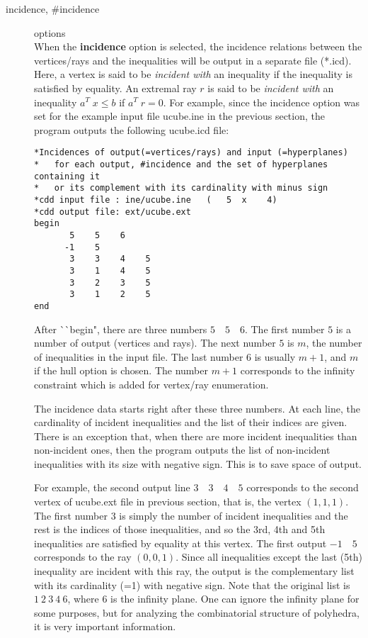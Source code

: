 \begin{description}
\item[incidence, \#incidence] options\\
When the {\bf incidence} option is selected, the incidence relations between
the vertices/rays and the inequalities will be output
in a separate file (*.icd).  Here, a vertex is said to be 
{\em incident with\/} an inequality if the inequality is satisfied by equality.
An extremal ray $r$ is said to be {\em incident with\/} 
an inequality $a^T \; x \le b$ if  $a^T \; r = 0$.  For example,
since the incidence option was set for the example input file ucube.ine in
the previous section, the program outputs the following ucube.icd file:
\begin{verbatim}
*Incidences of output(=vertices/rays) and input (=hyperplanes)
*   for each output, #incidence and the set of hyperplanes containing it
*   or its complement with its cardinality with minus sign
*cdd input file : ine/ucube.ine   (   5  x    4)
*cdd output file: ext/ucube.ext
begin
       5    5    6
      -1    5
       3    3    4    5
       3    1    4    5
       3    2    3    5
       3    1    2    5
end
\end{verbatim}
After ^^ ^^ begin", there are three numbers $5 \quad 5 \quad 6$.
The first number $5$ is a number of output (vertices and rays).
The next number $5$ is $m$, the number of inequalities in the input file.
The last number $6$ is usually $m+1$, and $m$ if the hull option is chosen.
The number $m+1$ corresponds to the infinity constraint which is added
for vertex/ray enumeration.

The incidence data starts right after these three numbers.
At each line, the cardinality of incident inequalities and
the list of their indices are given.  There is an exception that, when
there are more incident inequalities than non-incident ones, then the program
outputs the list of non-incident inequalities with its
size with negative sign.  This is to save space of output.

For example, the second output line $3 \quad 3 \quad 4 \quad 5$ 
corresponds to the
second vertex of ucube.ext file in previous section, that is, 
the vertex $(1, 1, 1)$.  The first number $3$ is simply the number
of incident inequalities and the rest is the indices of
those inequalities, and so the 3rd, 4th and 5th inequalities are
satisfied by equality at this vertex.   The first output
$-1 \quad 5$ corresponds to the ray  $(0,0,1)$.  Since all inequalities
except the last (5th) inequality are incident with this ray,
the output is the complementary list with its cardinality (=1) with negative
sign.  Note that the original list is $1 \: 2 \: 3 \: 4 \: 6$, where
$6$ is the infinity plane.  One can ignore the infinity
plane for some purposes,  but for analyzing the combinatorial 
structure of polyhedra, it is
very important information.


\end{description}
